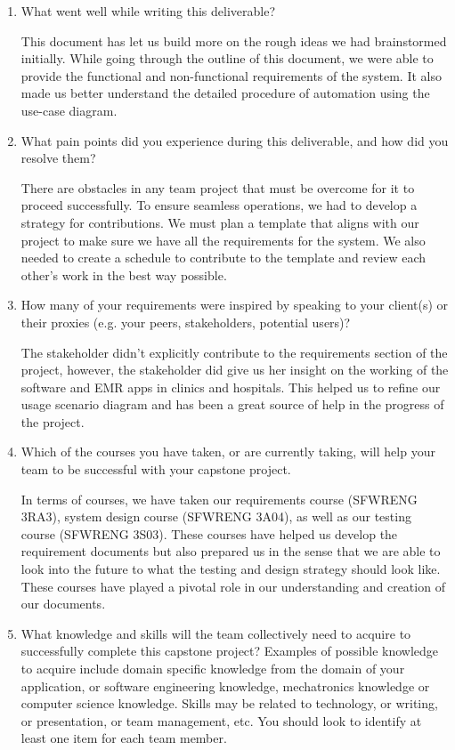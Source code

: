 \documentclass[12pt]{article}
\begin{document}
\begin{enumerate}
  \item What went well while writing this deliverable?
  
  This document has let us build more on the rough ideas we had brainstormed initially. While going through the outline of this document, we were able to provide the functional and non-functional requirements of the system. It also made us better understand the detailed procedure of automation using the use-case diagram. 

  \item What pain points did you experience during this deliverable, and how did
  you resolve them?

  There are obstacles in any team project that must be overcome for it to proceed successfully. To ensure seamless operations, we had to develop a strategy for contributions. We must plan a template that aligns with our project to make sure we have all the requirements for the system. We also needed to create a schedule to contribute to the template and review each other's work in the best way possible.
  
  \item How many of your requirements were inspired by speaking to your
  client(s) or their proxies (e.g. your peers, stakeholders, potential users)?

  The stakeholder didn't explicitly contribute to the requirements section of the project, however, the stakeholder did give us her insight on the working of the software and EMR apps in clinics and hospitals. This helped us to refine our usage scenario diagram and has been a great source of help in the progress of the project.

  \item Which of the courses you have taken, or are currently taking, will help
  your team to be successful with your capstone project.

  In terms of courses, we have taken our requirements course (SFWRENG 3RA3), system design course (SFWRENG 3A04), as well as our testing course (SFWRENG 3S03). These courses have helped us develop the requirement documents but also prepared us in the sense that we are able to look into the future to what the testing and design strategy should look like. These courses have played a pivotal role in our understanding and creation of our documents. 

  \item What knowledge and skills will the team collectively need to acquire to
  successfully complete this capstone project?  Examples of possible knowledge
  to acquire include domain specific knowledge from the domain of your
  application, or software engineering knowledge, mechatronics knowledge or
  computer science knowledge.  Skills may be related to technology, or writing,
  or presentation, or team management, etc.  You should look to identify at
  least one item for each team member.


\end{enumerate}
\end{document}

